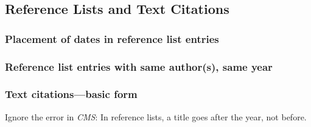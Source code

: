 \documentclass[11pt,letterpaper,oneside]{article}
\begin{document}
\begin{citeref}
\item \parencite[87--88]{strayed2012}
\item \parencite[32]{daum2015}
\item \parencite[188]{grazer2015}
\item \parencite[242--55]{garcia1988}
\item \parencite[310]{gould1984a}
\item \parencite[484--85]{bagley2015}
\item \parencite[312]{liu2015}
\end{citeref}

\setcounter{subsection}{1}
\subsection{Reference Lists and Text Citations}
\setcounter{subsection}{15}

\setcounter{subsubsection}{13}
\subsubsection{Placement of dates in reference list entries}

\begin{citeref}
\item \parencite{pager2015}
\item \parencite{unger2014}
\end{citeref}

\setcounter{subsubsection}{19}
\subsubsection{Reference list entries with same author(s), same year}

\begin{citeref}
\item \parencite[218]{fogel2004b}
\item \parencite[45--46]{fogel2004a}
\end{citeref}

\setcounter{subsubsection}{21}
\subsubsection{Text citations---basic form}

Ignore the error in \textit{CMS}: In reference lists, a title goes
after the year, not before.
\end{document}
